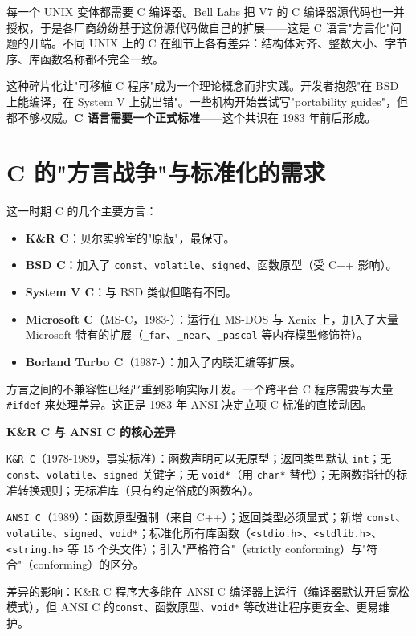 \documentclass[12pt,a4paper,fontset=fandol]{ctexbook}
\newcommand{\yearlabel}[1]{%
  \tcbox[on line,colback=yearheadbg,colframe=yearheadbg,
    boxrule=0pt,arc=1pt,left=3pt,right=3pt,top=1pt,bottom=1pt,
    colupper=white,fontupper=\scriptsize\bfseries]{#1}}
\newcommand{\kw}[1]{\texttt{#1}}
\newcommand{\yrlbl}[1]{\yearlabel{#1}}
\begin{document}
每一个 UNIX 变体都需要 C 编译器。Bell Labs 把 V7 的 C 编译器源代码也一并授权，于是各厂商纷纷基于这份源代码做自己的扩展——这是 C 语言"方言化"问题的开端。不同 UNIX 上的 C 在细节上各有差异：结构体对齐、整数大小、字节序、库函数名称都不完全一致。

\yrlbl{1983} 这种碎片化让"可移植 C 程序"成为一个理论概念而非实践。开发者抱怨"在 BSD 上能编译，在 System V 上就出错"。一些机构开始尝试写"portability guides"，但都不够权威。\textbf{C 语言需要一个正式标准}——这个共识在 1983 年前后形成。

\section{C 的"方言战争"与标准化的需求}

\yrlbl{1982-1985} 这一时期 C 的几个主要方言：

\begin{itemize}
  \item \textbf{K\&R C}：贝尔实验室的"原版"，最保守。
  \item \textbf{BSD C}：加入了 \kw{const}、\kw{volatile}、\kw{signed}、函数原型（受 C++ 影响）。
  \item \textbf{System V C}：与 BSD 类似但略有不同。
  \item \textbf{Microsoft C}（MS-C，1983-）：运行在 MS-DOS 与 Xenix 上，加入了大量 Microsoft 特有的扩展（\kw{\_far}、\kw{\_near}、\kw{\_pascal} 等内存模型修饰符）。
  \item \textbf{Borland Turbo C}（1987-）：加入了内联汇编等扩展。
\end{itemize}

方言之间的不兼容性已经严重到影响实际开发。一个跨平台 C 程序需要写大量 \kw{\#ifdef} 来处理差异。这正是 1983 年 ANSI 决定立项 C 标准的直接动因。

\begin{compare}
\textbf{K\&R C 与 ANSI C 的核心差异}

\kw{K\&R C}（1978-1989，事实标准）：函数声明可以无原型；返回类型默认 \kw{int}；无 \kw{const}、\kw{volatile}、\kw{signed} 关键字；无 \kw{void*}（用 \kw{char*} 替代）；无函数指针的标准转换规则；无标准库（只有约定俗成的函数名）。

\kw{ANSI C}（1989）：函数原型强制（来自 C++）；返回类型必须显式；新增 \kw{const}、\kw{volatile}、\kw{signed}、\kw{void*}；标准化所有库函数（\texttt{<stdio.h>}、\texttt{<stdlib.h>}、\texttt{<string.h>} 等 15 个头文件）；引入"严格符合"（strictly conforming）与"符合"（conforming）的区分。

差异的影响：K\&R C 程序大多能在 ANSI C 编译器上运行（编译器默认开启宽松模式），但 ANSI C 的\kw{const}、函数原型、\kw{void*} 等改进让程序更安全、更易维护。
\end{compare}
\end{document}
